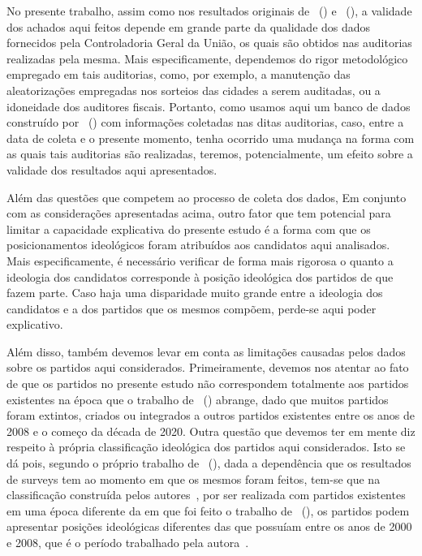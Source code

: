 \documentclass[
	12pt,				%
	openright,			%
	twoside,			%
	a4paper,			%
	openany,
	english,			%
	brazil				%
	]{abntex2}
\begin{document}
No presente trabalho, assim como nos resultados originais de ~(\citeyear{ferraz2008exposing}) e ~(\citeyear{Avis2018Oct}), a validade dos achados aqui feitos depende em grande parte da qualidade dos dados fornecidos pela Controladoria Geral da União, os quais são obtidos nas auditorias realizadas pela mesma. Mais especificamente, dependemos do rigor metodológico empregado em tais auditorias, como, por exemplo, a manutenção das aleatorizações empregadas nos sorteios das cidades a serem auditadas, ou a idoneidade dos auditores fiscais. Portanto, como usamos aqui um banco de dados construído por ~(\citeyear{Brollo2013Aug}) com informações coletadas nas ditas auditorias, caso, entre a data de coleta e o presente momento, tenha ocorrido uma mudança na forma com as quais tais auditorias são realizadas, teremos, potencialmente, um efeito sobre a validade dos resultados aqui apresentados. %

Além das questões que competem ao processo de coleta dos dados, 
Em conjunto com as considerações apresentadas acima, outro fator que tem potencial para limitar a capacidade explicativa do presente estudo é a forma com que os posicionamentos ideológicos foram atribuídos aos candidatos aqui analisados. Mais especificamente, é necessário verificar de forma mais rigorosa o quanto a ideologia dos candidatos corresponde à posição ideológica dos partidos de que fazem parte. Caso haja uma disparidade muito grande entre a ideologia dos candidatos e a dos partidos que os mesmos compõem, perde-se aqui poder explicativo.

Além disso, também devemos levar em conta as limitações causadas pelos dados sobre os partidos aqui considerados. Primeiramente, devemos nos atentar ao fato de que os partidos no presente estudo não correspondem totalmente aos partidos existentes na época que o trabalho de ~(\citeyear{Brollo2013Aug}) abrange, dado que muitos partidos foram extintos, criados ou integrados a outros partidos existentes entre os anos de 2008 e o começo da década de 2020. Outra questão que devemos ter em mente diz respeito à própria classificação ideológica dos partidos aqui considerados. Isto se dá pois, segundo o próprio trabalho de ~(\citeyear{Bolognesi2022Sep}), dada a dependência que os resultados de surveys tem ao momento em que os mesmos foram feitos, tem-se que na classificação construída pelos autores~\cite{Bolognesi2022Sep}, por ser realizada com partidos existentes em uma época diferente da em que foi feito o trabalho de ~(\citeyear{Brollo2013Aug}), os partidos podem apresentar posições ideológicas diferentes das que possuíam entre os anos de 2000 e 2008, que é o período trabalhado pela autora~\cite{Brollo2013Aug}.
\end{document}
